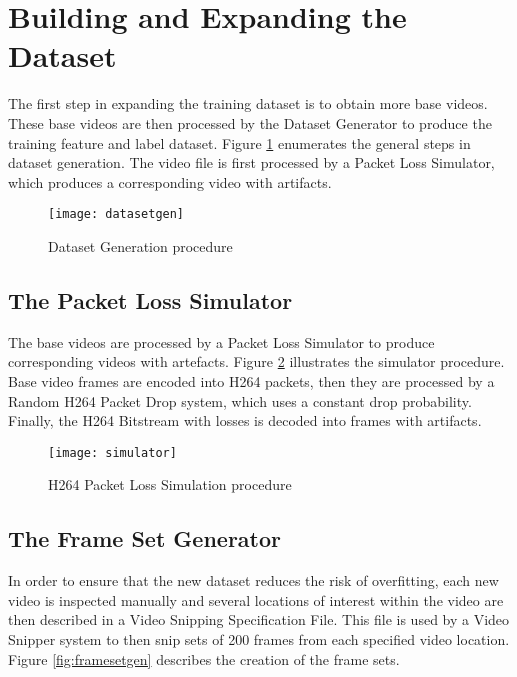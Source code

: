 \section{Building and Expanding the Dataset}
\label{sec:sol_dataset}

The first step in expanding the training dataset is to obtain more base videos. These base videos are then processed by the Dataset Generator to produce the training feature and label dataset. Figure \ref{fig:datasetgen} enumerates the general steps in dataset generation. The video file is first processed by a Packet Loss Simulator, which produces a corresponding video with artifacts. 

\begin{figure} [!h]
  \centering
  
  \texttt{[image: datasetgen]}
  
  \caption{Dataset Generation procedure}
  \label{fig:datasetgen}

\end{figure}

\subsection{The Packet Loss Simulator}
\label{sec:sol_simulation}

The base videos are processed by a Packet Loss Simulator to produce corresponding videos with artefacts. Figure \ref{fig:simulator} illustrates the simulator procedure. Base video frames are encoded into H264 packets, then they are processed by a Random H264 Packet Drop system, which uses a constant drop probability. Finally, the H264 Bitstream with losses is decoded into frames with artifacts.

\begin{figure} [!h]
  \centering
  
  \texttt{[image: simulator]}
  
  \caption{H264 Packet Loss Simulation procedure}
  \label{fig:simulator}

\end{figure}

\subsection{The Frame Set Generator}
\label{sec:sol_framesetgen}

In order to ensure that the new dataset reduces the risk of overfitting, each new video is inspected manually and several locations of interest within the video are then described in a Video Snipping Specification File. This file is used by a Video Snipper system to then snip sets of 200 frames from each specified video location. Figure \ref{fig:framesetgen} describes the creation of the frame sets.

